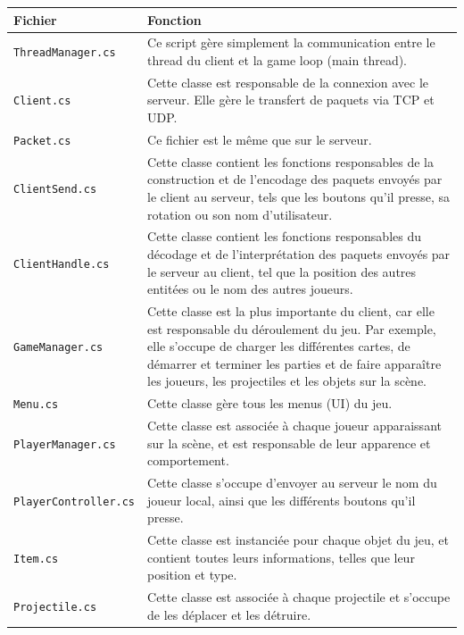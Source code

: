 \documentclass[a4paper]{article}
\begin{document}
\begin{center}
\begin{longtable}{|l|p{10cm}|}
    \hline
    Fichier & Fonction \\
    \hline\hline
    \texttt{ThreadManager.cs}\footnotemark[1] & Ce script gère simplement la communication entre le thread du client et la game loop (main thread).\\
    \hline
    \texttt{Client.cs}\footnotemark[1] & Cette classe est responsable de la connexion avec le serveur. Elle gère le transfert de paquets via TCP et UDP.\\
    \hline
    \texttt{Packet.cs}\footnotemark[1] & Ce fichier est le même que sur le serveur.\\
    \hline
    \texttt{ClientSend.cs} & Cette classe contient les fonctions responsables de la construction et de l’encodage des paquets envoyés par le client au serveur, tels que les boutons qu’il presse, sa rotation ou son nom d’utilisateur.\\
    \hline
    \texttt{ClientHandle.cs} & Cette classe contient les fonctions responsables du décodage et de l'interprétation des paquets envoyés par le serveur au client, tel que la position des autres entitées ou le nom des autres joueurs.\\
    \hline
    \texttt{GameManager.cs} & Cette classe est la plus importante du client, car elle est responsable du déroulement du jeu. Par exemple, elle s’occupe de charger les différentes cartes, de démarrer et terminer les parties et de faire apparaître les joueurs, les projectiles et les objets sur la scène.\\
    \hline
    \texttt{Menu.cs} & Cette classe gère tous les menus (UI) du jeu.\\
    \hline
    \texttt{PlayerManager.cs} & Cette classe est associée à chaque joueur apparaissant sur la scène, et est responsable de leur apparence et comportement.\\
    \hline
    \texttt{PlayerController.cs} & Cette classe s’occupe d'envoyer au serveur le nom du joueur local, ainsi que les différents boutons qu’il presse.\\
    \hline
    \texttt{Item.cs} & Cette classe est instanciée pour chaque objet du jeu, et contient toutes leurs informations, telles que leur position et type.\\
    \hline
    \texttt{Projectile.cs} & Cette classe est associée à chaque projectile et s’occupe de les déplacer et les détruire.\\

\end{longtable}
\end{center}
\end{document}
